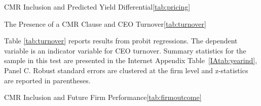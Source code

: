\documentclass[a4paper,12pt]{article}
\begin{document}
\begin{singlespace}
\begin{papertable}{CMR Inclusion and Predicted Yield Differential}{\ref{tab:pricing}}{}
    \startdata
    
\end{papertable}



\begin{papertable}{The Presence of a CMR Clause and CEO Turnover}{\ref{tab:turnover}}{} \label{tab:turnover}
    
    Table \ref{tab:turnover} reports results from probit regressions.
    The dependent variable is an indicator variable for CEO turnover.
    Summary statistics for the sample in this test are presented in the Internet Appendix Table~\ref{IAtab:yearind}, Panel C. 
    Robust standard errors are clustered at the firm level and z-statistics are reported in parentheses.
    \postamble
    
    \startdata
    \def\arraystretch{1.1}
    
\end{papertable}



\begin{landscapepapertable}{CMR Inclusion and Future Firm Performance}{\ref{tab:firmoutcome}}{\skipline}   \label{tab:firmoutcome}


\end{landscapepapertable}
\end{singlespace}
\end{document}
